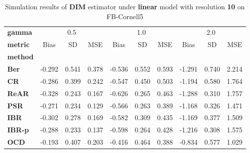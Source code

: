 \begin{table}
\centering
\caption{Simulation results of \textbf{DIM} estimator under \textbf{linear} model with resolution \textbf{10} on FB-Cornell5}
\begin{tabular}{lccccccccc}
\toprule
\textbf{gamma} & \multicolumn{3}{c}{0.5} & \multicolumn{3}{c}{1.0} & \multicolumn{3}{c}{2.0} \\
\textbf{metric} &   Bias &     SD &    MSE &   Bias &     SD &    MSE &   Bias &     SD &    MSE \\
\textbf{method} &        &        &        &        &        &        &        &        &        \\
\midrule
\textbf{Ber} & -0.292 &  0.541 &  0.378 & -0.536 &  0.552 &  0.593 & -1.291 &  0.740 &  2.214 \\
\textbf{CR} & -0.286 &  0.399 &  0.242 & -0.547 &  0.450 &  0.503 & -1.194 &  0.580 &  1.764 \\
\textbf{ReAR} & -0.328 &  0.243 &  0.167 & -0.626 &  0.265 &  0.463 & -1.288 &  0.310 &  1.757 \\
\textbf{PSR} & -0.271 &  0.234 &  0.129 & -0.566 &  0.263 &  0.389 & -1.168 &  0.326 &  1.471 \\
\textbf{IBR} & -0.302 &  0.278 &  0.169 & -0.582 &  0.309 &  0.435 & -1.169 &  0.377 &  1.509 \\
\textbf{IBR-p} & -0.288 &  0.233 &  0.137 & -0.598 &  0.264 &  0.428 & -1.216 &  0.308 &  1.575 \\
\textbf{OCD} & -0.193 &  0.407 &  0.203 & -0.416 &  0.464 &  0.388 & -0.834 &  0.577 &  1.029 \\
\bottomrule
\end{tabular}
\end{table}
